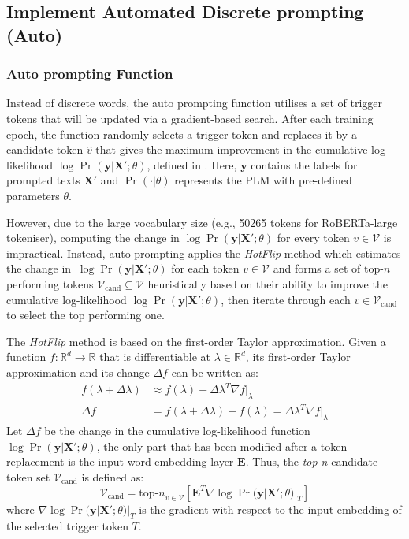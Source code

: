 \subsection{Implement Automated Discrete prompting (Auto)}
\subsubsection{Auto prompting Function} \label{sec:auto-prompt}
Instead of discrete words, the auto prompting function utilises a set of trigger tokens that will be updated via a gradient-based search. After each training epoch, the function randomly selects a trigger token and replaces it by a candidate token $\hat{v}$ that gives the maximum improvement in the cumulative log-likelihood $\log \Pr(\mathbf{y} | \mathbf{X}'; \theta)$, defined in . Here, $\mathbf{y}$ contains the labels for prompted texts $\mathbf{X}'$ and $\Pr(\cdot|\theta)$ represents the PLM with pre-defined parameters $\theta$.

However, due to the large vocabulary size (e.g., 50265 tokens for RoBERTa-large tokeniser), computing the change in $\log \Pr(\mathbf{y} | \mathbf{X}'; \theta)$ for every token $v \in \mathcal{V}$ is impractical. Instead, auto prompting applies the \emph{HotFlip} \cite{Ebrahimi17HotFlip} method which estimates the change in $\ \log \Pr(\mathbf{y} | \mathbf{X}'; \theta)$ for each token $v \in \mathcal{V}$ and forms a set of top-$n$ performing tokens $\mathcal{V}_{\text{cand}} \subseteq \mathcal{V}$ heuristically based on their ability to improve the cumulative log-likelihood $\log \Pr(\mathbf{y} | \mathbf{X}'; \theta)$, then iterate through each $v \in \mathcal{V}_{\text{cand}}$ to select the top performing one.

The \emph{HotFlip} method is based on the first-order Taylor approximation. Given a function $f: \mathbb{R}^d \to \mathbb{R}$ that is differentiable at $\lambda \in \mathbb{R}^d$, its first-order Taylor approximation and its change $\Delta f$ can be written as:
\begin{equation}
\begin{split}
    f(\lambda + \Delta \lambda) & \approx f(\lambda) + \Delta \lambda^T \nabla f|_{\lambda} \\
    \Delta f & = f(\lambda + \Delta \lambda) - f(\lambda) = \Delta \lambda^T \nabla f|_{\lambda}
\end{split}
\end{equation} 
Let $\Delta f$ be the change in the cumulative log-likelihood function $\log \Pr(\mathbf{y} | \mathbf{X}'; \theta)$, the only part that has been modified after a token replacement is the input word embedding layer $\textbf{E}$. Thus, the \emph{top-n} candidate token set $\mathcal{V}_\text{cand}$ is defined as:
\begin{equation}
    \mathcal{V}_{\text{cand}} = {\text{top-}n}_{v\in \mathcal{V}} [\mathbf{E}^T \nabla \log \Pr(\mathbf{y} | \mathbf{X}'; \theta)|_{T}]
\end{equation}
where $\nabla \log \Pr(\mathbf{y} | \mathbf{X}'; \theta)|_T$ is the gradient with respect to the input embedding of the selected trigger token $T$.

